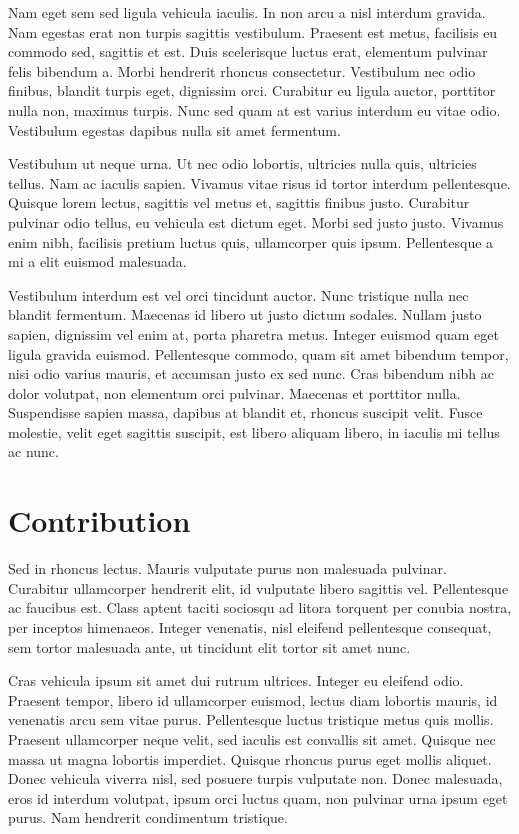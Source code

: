 Nam eget sem sed ligula vehicula iaculis. In non arcu a nisl interdum gravida. Nam egestas erat non turpis sagittis vestibulum. Praesent est metus, facilisis eu commodo sed, sagittis et est. Duis scelerisque luctus erat, elementum pulvinar felis bibendum a. Morbi hendrerit rhoncus consectetur. Vestibulum nec odio finibus, blandit turpis eget, dignissim orci. Curabitur eu ligula auctor, porttitor nulla non, maximus turpis. Nunc sed quam at est varius interdum eu vitae odio. Vestibulum egestas dapibus nulla sit amet fermentum.

Vestibulum ut neque urna. Ut nec odio lobortis, ultricies nulla quis, ultricies tellus. Nam ac iaculis sapien. Vivamus vitae risus id tortor interdum pellentesque. Quisque lorem lectus, sagittis vel metus et, sagittis finibus justo. Curabitur pulvinar odio tellus, eu vehicula est dictum eget. Morbi sed justo justo. Vivamus enim nibh, facilisis pretium luctus quis, ullamcorper quis ipsum. Pellentesque a mi a elit euismod malesuada.

Vestibulum interdum est vel orci tincidunt auctor. Nunc tristique nulla nec blandit fermentum. Maecenas id libero ut justo dictum sodales. Nullam justo sapien, dignissim vel enim at, porta pharetra metus. Integer euismod quam eget ligula gravida euismod. Pellentesque commodo, quam sit amet bibendum tempor, nisi odio varius mauris, et accumsan justo ex sed nunc. Cras bibendum nibh ac dolor volutpat, non elementum orci pulvinar. Maecenas et porttitor nulla. Suspendisse sapien massa, dapibus at blandit et, rhoncus suscipit velit. Fusce molestie, velit eget sagittis suscipit, est libero aliquam libero, in iaculis mi tellus ac nunc.

\section{Contribution}

Sed in rhoncus lectus. Mauris vulputate purus non malesuada pulvinar. Curabitur ullamcorper hendrerit elit, id vulputate libero sagittis vel. Pellentesque ac faucibus est. Class aptent taciti sociosqu ad litora torquent per conubia nostra, per inceptos himenaeos. Integer venenatis, nisl eleifend pellentesque consequat, sem tortor malesuada ante, ut tincidunt elit tortor sit amet nunc.

Cras vehicula ipsum sit amet dui rutrum ultrices. Integer eu eleifend odio. Praesent tempor, libero id ullamcorper euismod, lectus diam lobortis mauris, id venenatis arcu sem vitae purus. Pellentesque luctus tristique metus quis mollis. Praesent ullamcorper neque velit, sed iaculis est convallis sit amet. Quisque nec massa ut magna lobortis imperdiet. Quisque rhoncus purus eget mollis aliquet. Donec vehicula viverra nisl, sed posuere turpis vulputate non. Donec malesuada, eros id interdum volutpat, ipsum orci luctus quam, non pulvinar urna ipsum eget purus. Nam hendrerit condimentum tristique.

